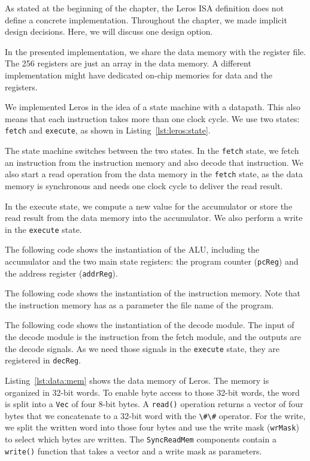 \documentclass[%
    10pt,
    headinclude, footexclude,
    openright, %
    notitlepage,
    cleardoubleempty,
    headsepline,
    pointlessnumbers,
    bibtotoc, idxtotoc,
    ]{scrbook}
\newcommand{\code}[1]{{\lstinline[basicstyle=\small\ttfamily]{#1}}}
\begin{document}
As stated at the beginning of the chapter, the Leros ISA definition does not define a
concrete implementation. Throughout the chapter, we made implicit design decisions.
Here, we will discuss one design option.

In the presented implementation, we share the data memory with the register file.
The 256 registers are just an array in the data memory. A different implementation might
have dedicated on-chip memories for data and the registers.

We implemented Leros in the idea of a state machine with a datapath.
This also means that each instruction takes more than one clock cycle.
We use two states: \code{fetch} and \code{execute}, as shown in Listing~\ref{lst:leros:state}.


\noindent The state machine switches between the two states.
In the \code{fetch} state, we fetch an instruction from the instruction
memory and also decode that instruction. We also start a read operation
from the data memory in the \code{fetch} state, as the data memory
is synchronous and needs one clock cycle to deliver the read result.

In the execute state, we compute a new value for the accumulator
or store the read result from the data memory into the accumulator.
We also perform a write in the \code{execute} state.

The following code shows the instantiation of the ALU, including the
accumulator and the two main state registers: the program counter (\code{pcReg})
and the address register (\code{addrReg}).


The following code shows the instantiation of the instruction memory.
Note that the instruction memory has as a parameter the file name
of the program.


The following code shows the instantiation of the decode module.
The input of the decode module is the instruction from the fetch
module, and the outputs are the decode signals. As we need those signals
in the \code{execute} state, they are registered in \code{decReg}.



Listing~\ref{lst:data:mem} shows the data memory of Leros.
The memory is organized in 32-bit words. To enable byte access to those
32-bit words, the word is split into a \code{Vec} of four 8-bit bytes.
A \code{read()} operation returns a vector of four bytes that we
concatenate to a 32-bit word with the \code{\#\#} operator.
For the write, we split the written word into those four bytes and
use the write mask (\code{wrMask}) to select which bytes are written.
The \code{SyncReadMem} components contain a \code{write()} function
that takes a vector and a write mask as parameters.
\end{document}
